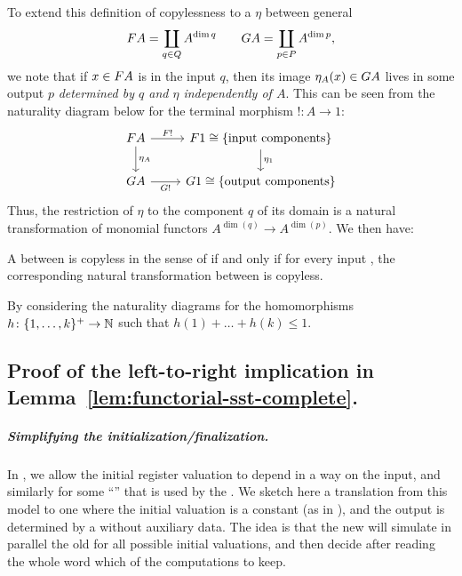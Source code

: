 To extend this definition of copylessness to a  $\eta$ between general 
\begin{align*}
\functor A = \coprod_{q \in Q} A^{\dim q} \qquad 
\functorg A = \coprod_{p \in P} A^{\dim p},
\end{align*}
we note that if $x\in\functor A$ is in the input  $q$, then its
image $\eta_A(x) \in \functorg A$ lives in some output  $p$
\emph{determined by $q$ and $\eta$ independently of $A$}. This can be seen from
the naturality diagram below for the terminal morphism $!\colon A \to 1$:
\[
  \begin{tikzcd}
    \functor A 
    \ar[r,"\functor !"]
    \ar[d, "\eta_A"]
    &
    \functor 1 \cong \{\text{input components}\}
    \ar[d, "\eta_1"]
    \\
    \functorg A
    \ar[r,"\functorg !"']
    &
    \functorg 1 \cong \{\text{output components}\}
  \end{tikzcd}
\]
Thus, the restriction of $\eta$ to the component $q$ of its domain is a natural
transformation of monomial functors $A^{\dim(q)} \to A^{\dim(p)}$. We then have:
\begin{claim}
  A  between  is copyless in the sense of  if and only if for every input , the corresponding natural transformation between  is copyless.
\end{claim}
\begin{claimproof}
  By considering the naturality diagrams for the homomorphisms
  $h\colon\{1,\dots,k\}^+ \to {\mathbb N}$ such that $h(1) + \dots + h(k) \leq 1$.
\end{claimproof}

\subsection{Proof of the left-to-right implication in Lemma~\ref{lem:functorial-sst-complete}.}

\subparagraph{Simplifying the initialization/finalization.}

In , we allow the initial register valuation to depend in a  way on the input, and similarly for some \enquote{} that is used by the . We sketch here a translation from this model to one where the initial valuation is a constant (as in ), and the output is determined by a  without auxiliary data. The idea is that the new \functorialsst will simulate in parallel the old \functorialsst for all possible initial valuations, and then decide after reading the whole word which of the computations to keep.

